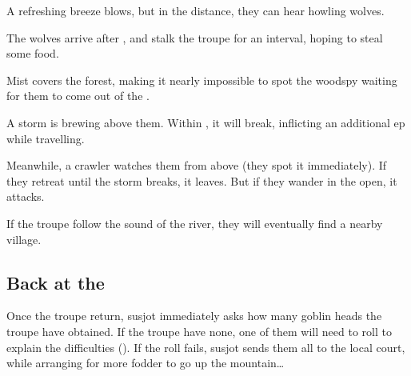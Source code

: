 \begin{multicols}{2}
\ifcase\value{temperature}
  A refreshing breeze blows, but in the distance, they can hear howling wolves.

  The wolves arrive after , and stalk the troupe for an interval, hoping to steal some food.

  \wolf
  \or
  Mist covers the forest, making it nearly impossible to spot the \gls{woodspy} waiting for them to come out of the .

  \woodspy
  \else
  A storm is brewing above them.
  Within , it will break, inflicting an additional \gls{ep} while travelling.

  Meanwhile, a \gls{crawler} watches them from above (they spot it immediately).
  If they retreat until the storm breaks, it leaves.
  But if they wander in the open, it attacks.
\fi

If the troupe follow the sound of the river, they will eventually find a nearby \gls{village}.

\subsection{Back at the }

Once the troupe return, \gls{susjot} immediately asks how many goblin heads the troupe have obtained.
If the troupe have none, one of them will need to roll  to explain the difficulties (\tn[8]).
If the roll fails, \gls{susjot} sends them all to the local \gls{court}, while arranging for more \gls{fodder} to go up the mountain\ldots

\end{multicols}
